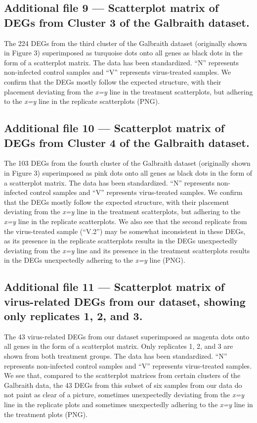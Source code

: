 \documentclass{bmcart}
\begin{document}
\begin{linenumbers}
\begin{backmatter}
  \subsection*{Additional file 9 --- Scatterplot matrix of DEGs from Cluster 3 of the Galbraith dataset.}
    The 224 DEGs from the third cluster of the Galbraith dataset (originally shown in Figure 3) superimposed as turquoise dots onto all genes as black dots in the form of a scatterplot matrix. The data has been standardized. ``N'' represents non-infected control samples and ``V'' represents virus-treated samples. We confirm that the DEGs mostly follow the expected structure, with their placement deviating from the \textit{x=y} line in the treatment scatterplots, but adhering to the \textit{x=y} line in the replicate scatterplots (PNG).
    
  \subsection*{Additional file 10 --- Scatterplot matrix of DEGs from Cluster 4 of the Galbraith dataset.} 
    The 103 DEGs from the fourth cluster of the Galbraith dataset (originally shown in Figure 3) superimposed as pink dots onto all genes as black dots in the form of a scatterplot matrix. The data has been standardized. ``N'' represents non-infected control samples and ``V'' represents virus-treated samples. We confirm that the DEGs mostly follow the expected structure, with their placement deviating from the \textit{x=y} line in the treatment scatterplots, but adhering to the \textit{x=y} line in the replicate scatterplots. We also see that the second replicate from the virus-treated sample (``V.2'') may be somewhat inconsistent in these DEGs, as its presence in the replicate scatterplots results in the DEGs unexpectedly deviating from the \textit{x=y} line and its presence in the treatment scatterplots results in the DEGs unexpectedly adhering to the \textit{x=y} line (PNG).
    
  \subsection*{Additional file 11 --- Scatterplot matrix of virus-related DEGs from our dataset, showing only replicates 1, 2, and 3.} 
    The 43 virus-related DEGs from our dataset superimposed as magenta dots onto all genes in the form of a scatterplot matrix. Only replicates 1, 2, and 3 are shown from both treatment groups. The data has been standardized. ``N'' represents non-infected control samples and ``V'' represents virus-treated samples. We see that, compared to the scatterplot matrices from certain clusters of the Galbraith data, the 43 DEGs from this subset of six samples from our data do not paint as clear of a picture, sometimes unexpectedly deviating from the \textit{x=y} line in the replicate plots and sometimes unexpectedly adhering to the \textit{x=y} line in the treatment plots (PNG).
    

\end{backmatter}
\end{linenumbers}
\end{document}
